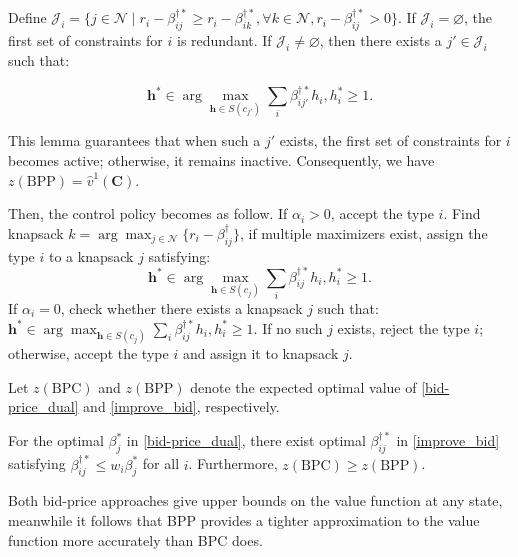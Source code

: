 
\begin{lem}\label{BPP}
Define $\mathcal{J}_{i} = \{j \in \mathcal{N} \mid r_i - \beta_{ij}^{\dag *} \geq r_i - \beta_{ik}^{\dag *},\forall k \in \mathcal{N}, r_i - \beta_{ij}^{\dag *} >0 \}$.
If $\mathcal{J}_{i} = \varnothing$, the first set of constraints for $i$ is redundant.
If $\mathcal{J}_{i} \neq \varnothing$, then there exists a $j{'} \in \mathcal{J}_{i}$ such that:

$$\bm{h}^{*} \in \arg\max_{\bm{h} \in S(c_{j{'}})} \sum_{i} \beta_{ij{'}}^{\dag *} h_{i}, h_{i}^{*} \geq 1.$$
\end{lem}

This lemma guarantees that when such a $j{'}$ exists, the first set of constraints for $i$ becomes active; otherwise, it remains inactive. Consequently, we have $z(\text{BPP}) = \hat{v}^{1}(\bm{C})$.

Then, the control policy becomes as follow. If $\alpha_{i} > 0$, accept the type $i$. Find knapsack $k = \arg \max_{j \in \mathcal{N}}\{r_i - \beta_{ij}^{\dag}\}$, if multiple maximizers exist, assign the type $i$ to a knapsack $j$ satisfying: $$\bm{h}^{*} \in \arg\max_{\bm{h} \in S(c_j)} \sum_{i} \beta_{ij}^{\dag *} h_{i}, h_{i}^{*} \geq 1.$$ If $\alpha_{i} = 0$, check whether there exists a knapsack $j$ such that: $\bm{h}^{*} \in \arg\max_{\bm{h} \in S(c_j)} \sum_{i} \beta_{ij}^{\dag *} h_{i}, h_{i}^{*} \geq 1$. If no such $j$ exists, reject the type $i$; otherwise, accept the type $i$ and assign it to knapsack $j$.

Let $z(\text{BPC})$ and $z(\text{BPP})$ denote the expected optimal value of \eqref{bid-price_dual} and \eqref{improve_bid}, respectively.

\begin{lem}\label{BPC_relation}
    For the optimal $\beta_{j}^{*}$ in \eqref{bid-price_dual}, there exist optimal $\beta_{ij}^{\dag *}$ in \eqref{improve_bid} satisfying $\beta_{ij}^{\dag *} \leq w_{i} \beta_{j}^{*}$ for all $i$. Furthermore, $z(\text{BPC}) \geq z(\text{BPP})$.
\end{lem}
    
    
Both bid-price approaches give upper bounds on the value function at any state, meanwhile it follows that BPP provides a tighter approximation to the value function more accurately than BPC does.

